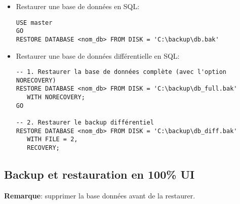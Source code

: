 \documentclass[a4paper]{article}
\begin{document}
\begin{itemize}
\begin{verbatim}
-- Créer le certificat encrypté avec la clé de chiffrement principale
CREATE CERTIFICATE MyCertificate
    WITH SUBJECT = 'Backup certificate',
    EXPIRY_DATE = '20201031';
\end{verbatim}



\item Restaurer une base de données en SQL:
\begin{verbatim}
USE master
GO
RESTORE DATABASE <nom_db> FROM DISK = 'C:\backup\db.bak'
\end{verbatim}



\item Restaurer une base de données différentielle en SQL:
\begin{verbatim}
-- 1. Restaurer la base de données complète (avec l'option NORECOVERY)
RESTORE DATABASE <nom_db> FROM DISK = 'C:\backup\db_full.bak'
   WITH NORECOVERY;
GO

-- 2. Restaurer le backup différentiel
RESTORE DATABASE <nom_db> FROM DISK = 'C:\backup\db_diff.bak'
   WITH FILE = 2,
   RECOVERY;
\end{verbatim}



\end{itemize}










\subsection{Backup et restauration en 100\% UI}





\textbf{Remarque}: supprimer la base données avant de la restaurer.
\end{document}
